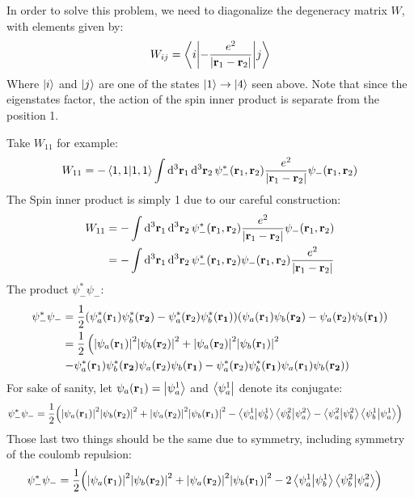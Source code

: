 \documentclass[12pt]{article}
\theoremstyle{plain}
\theoremstyle{definition}
\begin{document}
In order to solve this problem, we need to diagonalize the degeneracy matrix $W$, with elements given by:
\begin{align*}
  W_{ij}=\mel**{i}{-\frac{e^2}{\abs{\vb{r}_1-\vb{r}_2}}}{j}
\end{align*}
Where $\ket{i}$ and $\ket{j}$ are one of the states $\ket{1}\to\ket{4}$ seen above. Note that since the eigenstates factor, the action of the spin inner product is separate from the position 1.

Take $W_{11}$ for example:
\begin{align*}
  W_{11}=-\ip{1,1}{1,1}\int\dd[3]{\vb{r}_1}\dd[3]{\vb{r}_2}
  \psi^*_-(\vb{r}_1,\vb{r}_2)
  \frac{e^2}{\abs{\vb{r}_1-\vb{r}_2}}\psi_-(\vb{r}_1,\vb{r}_2)
\end{align*}
The Spin inner product is simply 1 due to our careful construction:
\begin{align*}
  W_{11}&=-\int\dd[3]{\vb{r}_1}\dd[3]{\vb{r}_2}\psi^*_-(\vb{r}_1,\vb{r}_2)
  \frac{e^2}{\abs{\vb{r}_1-\vb{r}_2}}\psi_-(\vb{r}_1,\vb{r}_2)\\
  &=-\int\dd[3]{\vb{r}_1}\dd[3]{\vb{r}_2}\psi^*_-(\vb{r}_1,\vb{r}_2)
  \psi_-(\vb{r}_1,\vb{r}_2)\frac{e^2}{\abs{\vb{r}_1-\vb{r}_2}}
\end{align*}
The product $\psi^*_-\psi_-$:
\begin{align*}
  \psi^*_-\psi_-&=\frac12
  \qty(\psi^*_a(\vb{r}_1)\psi^*_b(\vb{r_2})
  -\psi^*_a(\vb{r}_2)\psi^*_b(\vb{r_1}))
  \qty(\psi_a(\vb{r}_1)\psi_b(\vb{r_2})
  -\psi_a(\vb{r}_2)\psi_b(\vb{r_1}))\\
  &=\frac12\left(\abs{\psi_a(\vb{r}_1)}^2\abs{\psi_b(\vb{r}_2)}^2
    +\abs{\psi_a(\vb{r}_2)}^2\abs{\psi_b(\vb{r}_1)}^2\right.\\
  &\left.-\psi^*_a(\vb{r}_1)\psi^*_b(\vb{r_2})\psi_a(\vb{r}_2)\psi_b(\vb{r_1})
  -\psi^*_a(\vb{r}_2)\psi^*_b(\vb{r_1})\psi_a(\vb{r}_1)\psi_b(\vb{r_2})\right)
\end{align*}
For sake of sanity, let $\psi_a(\vb{r}_1)=\ket{\psi_a^1}$ and $\bra{\psi_a^1}$ denote its conjugate:
\begin{align*}
  \psi^*_-\psi_-&=\frac12\qty(\abs{\psi_a(\vb{r}_1)}^2\abs{\psi_b(\vb{r}_2)}^2
  +\abs{\psi_a(\vb{r}_2)}^2\abs{\psi_b(\vb{r}_1)}^2
  -\ip{\psi_a^1}{\psi_b^1}\ip{\psi_b^2}{\psi_a^2}
  -\ip{\psi_a^2}{\psi_b^2}\ip{\psi_b^1}{\psi_a^1})
\end{align*}
Those last two things should be the same due to symmetry, including symmetry of the coulomb repulsion:
\begin{align*}
  \psi^*_-\psi_-&=\frac12\qty(\abs{\psi_a(\vb{r}_1)}^2\abs{\psi_b(\vb{r}_2)}^2
  +\abs{\psi_a(\vb{r}_2)}^2\abs{\psi_b(\vb{r}_1)}^2
  -2\ip{\psi_a^1}{\psi_b^1}\ip{\psi_b^2}{\psi_a^2})
\end{align*}
\end{document}
